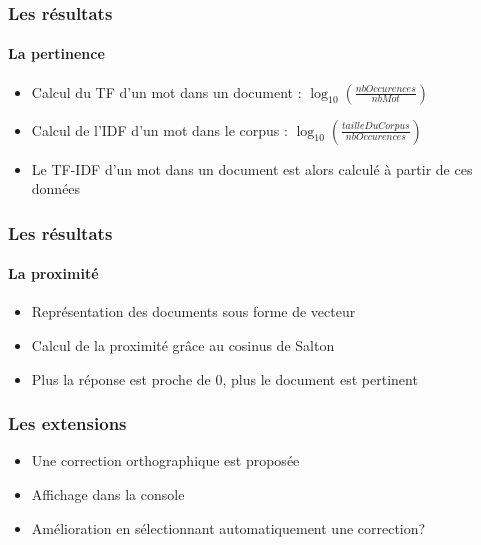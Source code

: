 \documentclass{beamer}
\begin{document}
\begin{frame}

\frametitle{Les r\'esultats}
\framesubtitle{La pertinence}

\begin{itemize}
 \item Calcul du TF d'un mot dans un document : $ \log_{10}(\frac{nbOccurences}{nbMot}) $
 \item Calcul de l'IDF d'un mot dans le corpus : $ \log_{10}(\frac{tailleDuCorpus}{nbOccurences}) $
 \item Le TF-IDF d'un mot dans un document est alors calcul\'e \`a partir de ces donn\'ees
\end{itemize}

 
\end{frame}

\begin{frame}

\frametitle{Les r\'esultats}
\framesubtitle{La proximit\'e}

\begin{itemize}
 \item Repr\'esentation des documents sous forme de vecteur
 \item Calcul de la proximit\'e gr\^ace au cosinus de Salton
 \item Plus la r\'eponse est proche de 0, plus le document est pertinent
\end{itemize}

 
\end{frame}

\begin{frame}

\frametitle{Les extensions}

\begin{itemize}
 \item Une correction orthographique est propos\'ee
 \item Affichage dans la console
 \item Am\'elioration en s\'electionnant automatiquement une correction?
\end{itemize}

 
\end{frame}
\end{document}

